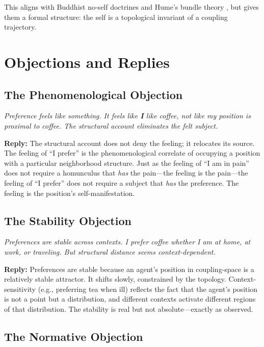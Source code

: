\documentclass[12pt,a4paper]{article}
\begin{document}
This aligns with Buddhist no-self doctrines \citep{siderits2007} and Hume's bundle theory \citep{hume1739}, but gives them a formal structure: the self is a topological invariant of a coupling trajectory.

\section{Objections and Replies}

\subsection{The Phenomenological Objection}

\textit{Preference feels like something. It feels like \textbf{I} like coffee, not like my position is proximal to coffee. The structural account eliminates the felt subject.}

\textbf{Reply:} The structural account does not deny the feeling; it relocates its source. The feeling of ``I prefer'' is the phenomenological correlate of occupying a position with a particular neighborhood structure. Just as the feeling of ``I am in pain'' does not require a homunculus that \emph{has} the pain---the feeling is the pain---the feeling of ``I prefer'' does not require a subject that \emph{has} the preference. The feeling is the position's self-manifestation.

\subsection{The Stability Objection}

\textit{Preferences are stable across contexts. I prefer coffee whether I am at home, at work, or traveling. But structural distance seems context-dependent.}

\textbf{Reply:} Preferences are stable because an agent's position in coupling-space is a relatively stable attractor. It shifts slowly, constrained by the topology. Context-sensitivity (e.g., preferring tea when ill) reflects the fact that the agent's position is not a point but a distribution, and different contexts activate different regions of that distribution. The stability is real but not absolute---exactly as observed.

\subsection{The Normative Objection}
\end{document}
